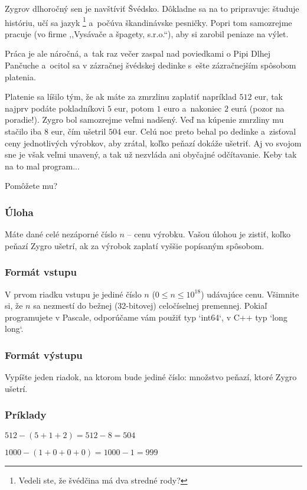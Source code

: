 Zygrov dlhoročný sen je navštíviť Švédsko. Dôkladne sa na to pripravuje: študuje históriu, učí sa jazyk%
\footnote{Vedeli ste, že švédčina má dva stredné rody?} a~počúva škandinávske pesničky.
Popri tom samozrejme pracuje (vo firme ,,Vysávače a špagety, s.r.o.``), aby si zarobil peniaze na výlet. 

Práca je ale náročná, a~tak raz večer zaspal nad poviedkami o Pipi Dlhej Pančuche
a~ocitol sa v zázračnej švédskej dedinke s~ešte zázračnejším spôsobom platenia.

Platenie sa líšilo tým, že ak máte za zmrzlinu zaplatiť napríklad $512$ eur, tak najprv podáte pokladníkovi $5$ eur,
potom $1$ euro a~nakoniec $2$ eurá (pozor na poradie!).
Zygro bol samozrejme veľmi nadšený. Veď na kúpenie zmrzliny mu stačilo iba $8$ eur, čím ušetril
$504$ eur. Celú noc preto behal po dedinke a~zisťoval ceny jednotlivých výrobkov, aby zrátal, koľko
peňazí dokáže ušetriť. Aj vo svojom sne je však veľmi unavený, a tak už nezvláda ani obyčajné
odčítavanie. Keby tak na to mal program...

Pomôžete mu?

\subsubsection{Úloha}

Máte dané celé nezáporné číslo $n$ -- cenu výrobku. Vašou úlohou je zistiť, koľko
peňazí Zygro ušetrí, ak za výrobok zaplatí vyššie popísaným spôsobom.

\subsubsection{Formát vstupu}

V prvom riadku vstupu je jediné číslo $n$ ($0 \leq n \leq 10^{18}$) udávajúce cenu. 
Všimnite si, že $n$ sa nezmestí do bežnej (32-bitovej) celočíselnej premennej.
Pokiaľ programujete v Pascale, odporúčame vám použiť typ `int64`, v C++ typ `long
long`.

\subsubsection{Formát výstupu}

Vypíšte jeden riadok, na ktorom bude jediné číslo: množstvo peňazí, ktoré Zygro
ušetrí.

\subsubsection{Príklady}

$512 - (5 + 1 + 2) = 512 - 8 = 504$

$1000 - (1 + 0 + 0 + 0) = 1000 - 1 = 999$